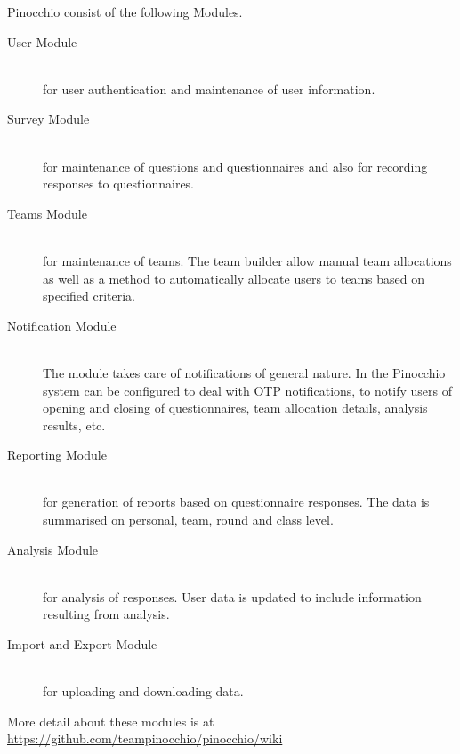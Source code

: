 
Pinocchio consist of the following Modules.  
\begin{description}
\item[User Module] \hfill \\ for user authentication and maintenance of user information.
\item[Survey Module] \hfill \\  for maintenance of questions and questionnaires and also  for recording responses to questionnaires.
\item[Teams Module] \hfill \\  for maintenance of teams. The team builder allow manual team allocations as well as a method to automatically allocate users to teams based on specified criteria.
\item[Notification Module] \hfill \\ The module takes care of notifications of general nature. In the Pinocchio system can be configured to deal with OTP notifications, to notify users of opening and closing of questionnaires,  team allocation details, analysis results, etc.
\item[Reporting Module] \hfill \\ for generation of reports based on questionnaire responses. The data is summarised on personal, team, round and class level. 
\item[Analysis Module] \hfill \\ for analysis of responses. User data is updated to include information resulting from analysis.
\item[Import and Export Module] \hfill \\ for uploading and downloading data.
\end{description}
More detail about these modules is at \url{https://github.com/teampinocchio/pinocchio/wiki}


